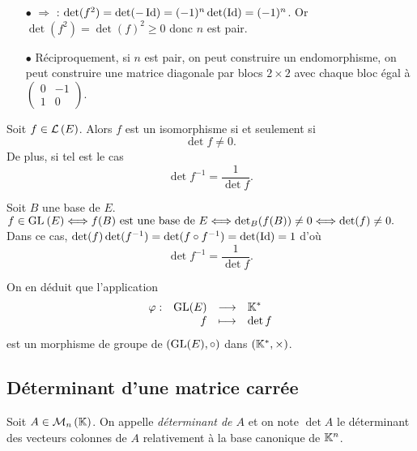 \documentclass{magnolia}
\begin{document}
\begin{sol}
\begin{itemize}
\item[$\bullet$] $\Rightarrow$ : $\mathop{\rm det}(f^2)=\mathop{\rm det}(-\operatorname{Id})=(-1)^n\mathop{\rm det}(\operatorname{Id})=(-1)^n$. Or $\det(f^2)=\det(f)^2\geq 0$ donc $n$ est pair.
\item[$\bullet$] Réciproquement, si $n$ est pair, on peut construire un endomorphisme, on peut construire une matrice diagonale par blocs $2\times 2$ avec chaque bloc égal à $\begin{pmatrix}0&-1\\1&0\end{pmatrix}$.
\end{itemize}
\end{sol}


\begin{proposition}
Soit $f\in\mathcal{L}\left(E\right)$. Alors $f$ est un isomorphisme si et seulement si
\[\det f\neq 0.\]
De plus, si tel est le cas
\[\det f^{-1}=\frac{1}{\det f}.\]
\end{proposition}

\begin{preuve}
Soit $B$ une base de $E$.
$f\in {\rm GL}_{}\left(E\right)\Longleftrightarrow f(B) \text{ est une base de } E \Longleftrightarrow \mathop{\rm det}_B(f(B))\neq 0 \Longleftrightarrow \mathop{\rm det}(f)\neq 0.$
Dans ce cas, $\mathop{\rm det}(f)\mathop{\rm det}(f^{-1})=\mathop{\rm det}(f\circ f^{-1})=\mathop{\rm det}(\operatorname{Id})=1$ d'où \[\det f^{-1}=\frac{1}{\det f}.\]
\end{preuve}

\begin{remarqueUnique}
\remarque On en déduit que l'application
  \[\begin{array}[t]{lrcl} \displaystyle{\varphi} : & \displaystyle{{\rm GL}(E)} & \longrightarrow & \displaystyle{\ensuremath{\mathbb{K}^*}} \\ & \displaystyle{f} & \longmapsto & \displaystyle{\mathop{\rm det}f} \end{array}\]
  est un morphisme de groupe de $({\rm GL}(E),\circ)$ dans $(\mathbb{K}^*,\times)$.
\end{remarqueUnique}

\subsection{Déterminant d'une matrice carrée}

\begin{definition}
Soit $A\in\mathcal{M}_{n}\left(\mathbb{K}\right)$. On appelle \emph{déterminant de $A$} et on note $\det A$
le déterminant des vecteurs colonnes de $A$ relativement à la base canonique de
$\mathbb{K}^n$.
\end{definition}
\end{document}
